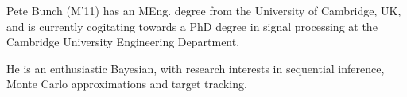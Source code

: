 \begin{IEEEbiography}{Pete Bunch} (M'11) has an MEng. degree from the University of Cambridge, UK, and is currently cogitating towards a PhD degree in signal processing at the Cambridge University Engineering Department.

He is an enthusiastic Bayesian, with research interests in sequential inference, Monte Carlo approximations and target tracking.
\end{IEEEbiography} 
